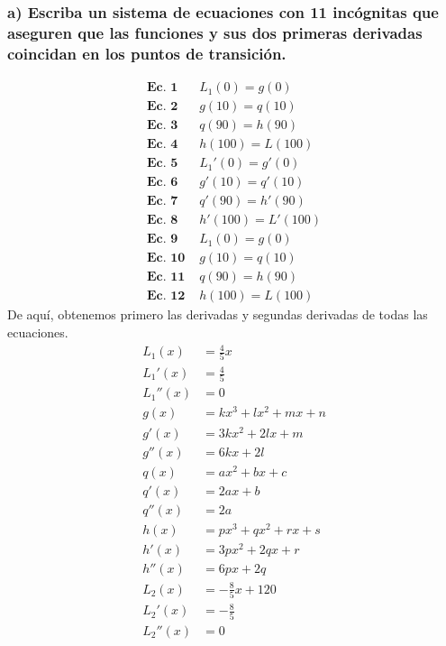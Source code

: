 \documentclass[11pt,letterpaper]{article}
\begin{document}
\subsubsection*{a) Escriba un sistema de ecuaciones con 11 incógnitas que aseguren que las funciones y sus dos primeras derivadas coincidan en los puntos de transición.}
\begin{equation*}
  \begin{split}
    \textbf{Ec. 1 } & L_1(0)=g(0) \\
    \textbf{Ec. 2 } & g(10)=q(10) \\
    \textbf{Ec. 3 } & q(90)=h(90) \\
    \textbf{Ec. 4 } & h(100)=L(100) \\
    \textbf{Ec. 5 } & L_1'(0)=g'(0) \\
    \textbf{Ec. 6 } & g'(10)=q'(10) \\
    \textbf{Ec. 7 } & q'(90)=h'(90) \\
    \textbf{Ec. 8 } & h'(100)=L'(100) \\
    \textbf{Ec. 9 } & L_1(0)=g(0) \\
    \textbf{Ec. 10 } & g(10)=q(10) \\
    \textbf{Ec. 11 } & q(90)=h(90) \\
    \textbf{Ec. 12 } & h(100)=L(100)
  \end{split}
\end{equation*}
De aquí, obtenemos primero las derivadas y segundas derivadas de todas las ecuaciones.
\begin{equation*}
  \begin{split}
    L_1(x) &= \frac{4}{5}x \\
    L_1'(x) &= \frac{4}{5} \\
    L_1''(x) &= 0 \\
    g(x) &= kx^3+lx^2+mx+n \\
    g'(x) &= 3kx^2+2lx+m \\
    g''(x) &= 6kx+2l \\
    q(x) &= ax^2+bx+c \\
    q'(x) &= 2ax+b \\
    q''(x) &= 2a \\
    h(x) &= px^3+qx^2+rx+s \\
    h'(x) &= 3px^2+2qx+r \\
    h''(x) &= 6px+2q \\
    L_2(x) &= -\frac{8}{5}x+120 \\
    L_2'(x) &= -\frac{8}{5} \\
    L_2''(x) &= 0
  \end{split}
\end{equation*}
\end{document}
